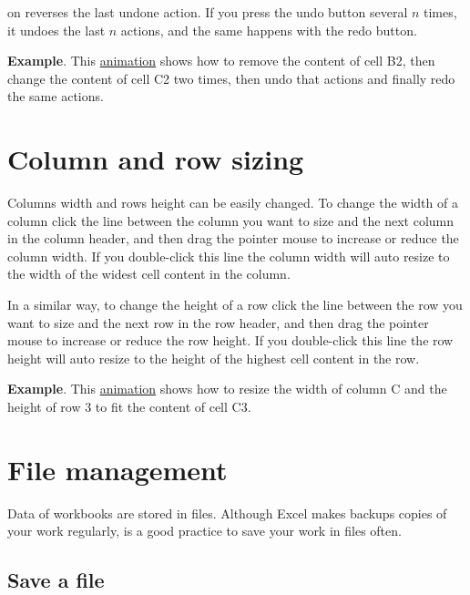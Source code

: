 on reverses the last undone action. If you press the undo button several $n$ times, it undoes the last $n$ actions, and the same happens with the redo button.

\textbf{Example}.  This \href{http://aprendeconalf.es/office/excel/manual/img/example_undo.gif}{animation} shows how to remove the content of cell B2, then change the content of cell C2 two times, then undo that actions and finally redo the same actions.

\section{Column and row sizing}\hypertarget{column-and-row-sizing}{}\label{column-and-row-sizing}

Columns width and rows height can be easily changed. To change the width of a column click the line between the column you want to size and the next column in the column header, and then drag the pointer mouse to increase or reduce the column width. If you double-click this line the column width will auto resize to the width of the widest cell content in the column.

In a similar way, to change the height of a row click the line between the row you want to size and the next row in the row header, and then drag the pointer mouse to increase or reduce the row height. If you double-click this line the row height will auto resize to the height of the highest cell content in the row.

\textbf{Example}.  This \href{http://aprendeconalf.es/office/excel/manual/img/example_row_column_resize.gif}{animation} shows how to resize the width of column C and the height of row 3 to fit the content of cell C3.


\section{File management}\hypertarget{file-management}{}\label{file-management}

Data of workbooks are stored in files. Although Excel makes backups copies of your work regularly, is a good practice to save your work in files often.

\subsection{Save a file}\hypertarget{save-a-file}{}\label{save-a-file}

